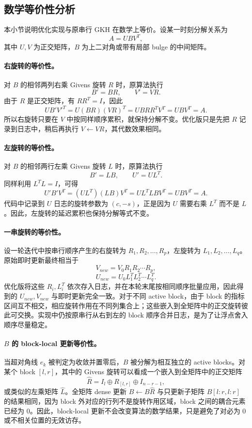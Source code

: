 ﻿\documentclass[UTF8,a4paper]{ctexart}
\begin{document}
\subsection{数学等价性分析}

本小节说明优化实现与原串行 GKH 在数学上等价。设某一时刻分解关系为
\[
  A = U B V^T,
\]
其中 $U,V$ 为正交矩阵，$B$ 为上二对角或带有局部 bulge 的中间矩阵。

\paragraph{右旋转的等价性。}
对 $B$ 的相邻两列右乘 Givens 旋转 $R$ 时，原算法执行
\[
  B' = B R, \qquad V' = V R.
\]
由于 $R$ 是正交矩阵，有 $R R^T=I$，因此
\[
  U B' {V'}^T
  = U (B R) (V R)^T
  = U B R R^T V^T
  = U B V^T
  = A.
\]
所以右旋转只要在 $V$ 中按同样顺序累积，就保持分解不变。优化版只是先把 $R$ 记录到日志中，稍后再执行 $V\leftarrow V R$，其代数效果相同。

\paragraph{左旋转的等价性。}
对 $B$ 的相邻两行左乘 Givens 旋转 $L$ 时，原算法执行
\[
  B' = L B, \qquad U' = U L^T.
\]
同样利用 $L^T L=I$，可得
\[
  U' B' V^T
  = (U L^T)(L B)V^T
  = U L^T L B V^T
  = U B V^T
  = A.
\]
代码中记录到 $U$ 日志的旋转参数为 $(c,-s)$，正是因为 $U$ 需要右乘 $L^T$ 而不是 $L$。因此，左旋转的延迟累积也保持分解等式不变。

\paragraph{一串旋转的等价性。}
设一轮迭代中按串行顺序产生的右旋转为 $R_1,R_2,\ldots,R_p$，左旋转为 $L_1,L_2,\ldots,L_q$。原始即时更新最终相当于
\[
  V_{new}=V_0R_1R_2\cdots R_p,
\]
\[
  U_{new}=U_0L_1^TL_2^T\cdots L_q^T.
\]
优化版将这些 $R_i,L_i^T$ 依次存入日志，并在本轮末尾按相同顺序批量应用，因此得到的 $U_{new},V_{new}$ 与即时更新完全一致。对于不同 active block，由于 block 的指标区间互不相交，相应旋转作用在不同列集合上；这些嵌入到全矩阵中的正交旋转彼此可交换。实现中仍按原串行从右到左的 block 顺序合并日志，是为了让浮点舍入顺序尽量稳定。

\paragraph{$B$ 的 block-local 更新等价性。}
当超对角线 $e_k$ 被判定为收敛并置零后，$B$ 被分解为相互独立的 active blocks。对某个 block $[l,r]$，其中的 Givens 旋转可以看成一个嵌入到全矩阵中的正交矩阵
\[
  \widehat R = I_l \oplus R_{[l,r]} \oplus I_{n-r-1},
\]
或类似的左乘矩阵 $\widehat L$。全矩阵 dense 更新 $B\leftarrow B\widehat R$ 与只更新子矩阵 $B[l:r,l:r]$ 的结果相同，因为 block 外对应的行列不是旋转作用区域，block 之间的耦合元素已经为 0。因此，block-local 更新不会改变算法的数学结果，只是避免了对必为 0 或不相关位置的无效访存。
\end{document}

